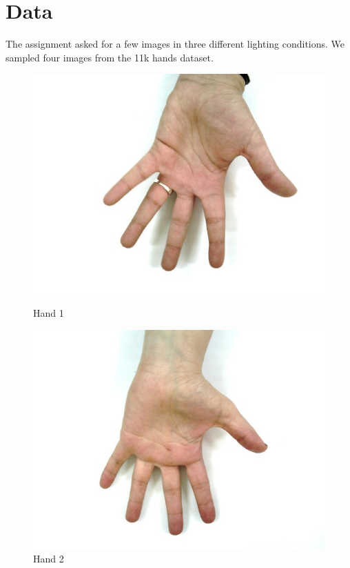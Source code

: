 \documentclass{report}
\begin{document}
\chapter{Data}
The assignment asked for a few images in three different lighting conditions. We sampled 
four images from the 11k hands dataset.
\begin{figure}[H]
    \includegraphics[width=\linewidth]{Images/hand1.png}
    \caption{Hand 1}
  \endminipage\hfill
    \includegraphics[width=\linewidth]{Images/hand2.png}
    \caption{Hand 2}
  \endminipage\hfill

\end{figure}
\end{document}
